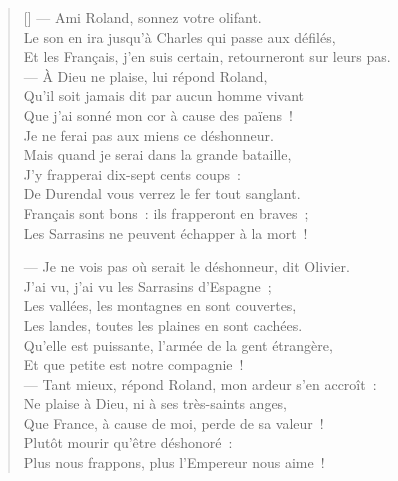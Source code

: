 \documentclass[a4paper,14pt,french]{extarticle}
\begin{document}
\begin{verse}[\versewidth]
— Ami Roland, sonnez votre olifant.\\
Le son en ira jusqu’à Charles qui passe aux défilés,\\
Et les Français, j’en suis certain, retourneront sur leurs pas.\\
— À Dieu ne plaise, lui répond Roland,\\
Qu’il soit jamais dit par aucun homme vivant\\
Que j’ai sonné mon cor à cause des païens !\\
Je ne ferai pas aux miens ce déshonneur.\\
Mais quand je serai dans la grande bataille,\\
J’y frapperai dix-sept cents coups :\\
De Durendal vous verrez le fer tout sanglant.\\
Français sont bons : ils frapperont en braves ;\\
Les Sarrasins ne peuvent échapper à la mort !

— Je ne vois pas où serait le déshonneur, dit Olivier.\\
J’ai vu, j’ai vu les Sarrasins d’Espagne ;\\
Les vallées, les montagnes en sont couvertes,\\
Les landes, toutes les plaines en sont cachées.\\
Qu’elle est puissante, l’armée de la gent étrangère,\\
Et que petite est notre compagnie !\\
— Tant mieux, répond Roland, mon ardeur s’en accroît :\\
Ne plaise à Dieu, ni à ses très-saints anges,\\
Que France, à cause de moi, perde de sa valeur !\\
Plutôt mourir qu’être déshonoré :\\
Plus nous frappons, plus l’Empereur nous aime !


\end{verse}
\end{document}
